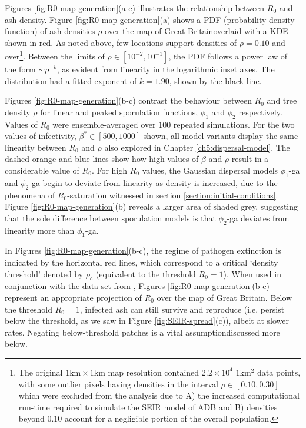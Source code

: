 
Figures \ref{fig:R0-map-generation}(a-c) illustrates the relationship between $R_0$ and ash density.
Figure \ref{fig:R0-map-generation}(a) shows a PDF (probability density function) of ash densities $\rho$ over the map of Great Britain\textemdash overlaid with a KDE shown in red.
As noted above, few locations support densities of $\rho=0.10$ and over\footnote{
The original $\mathrm{1km \times 1km}$ map resolution contained $2.2\times 10^4$ $1\mathrm{km^2}$ data points, 
with some outlier pixels having densities in the interval $\rho \in [0.10, 0.30]$ which were excluded from the analysis due to 
A) the increased computational run-time required to simulate the SEIR model of ADB  
and B) densities beyond $0.10$ account for a negligible portion of the overall population.}. 
Between the limits of $\rho \in [10^{-2}, 10^{-1}]$, the PDF follows a power law of the form $\sim \rho ^{-k}$, as evident from linearity in the logarithmic inset axes.
The distribution had a fitted exponent of $k=1.90$, shown by the black line.

Figures \ref{fig:R0-map-generation}(b-c) contrast the behaviour between $R_0$ and tree density $\rho$ for linear and peaked sporulation functions, $\phi_1$ and $\phi_2$ respectively.
Values of $R_0$ were ensemble-averaged over $100$ repeated simulations.
For the two values of infectivity, $\beta^*\in [500, 1000]$ shown, all model variants display the same linearity between $R_0$ and $\rho$ \textemdash also explored in Chapter \ref{ch5:dispersal-model}.
The dashed orange and blue lines show how high values of $\beta$ and $\rho$ result in a considerable value of $R_0$.
For high $R_0$ values, the Gaussian dispersal models $\phi_1$-ga and $\phi_2$-ga begin to deviate from linearity as density is increased,
due to the phenomena of $R_0$-saturation witnessed in section \ref{section:initial-conditions}.
Figure \ref{fig:R0-map-generation}(b) reveals a larger area of shaded grey, 
suggesting that the sole difference between sporulation models is that $\phi_2$-ga deviates from linearity more than $\phi_1$-ga.

In Figures \ref{fig:R0-map-generation}(b-c), the regime of pathogen extinction is indicated by the horizontal red lines, 
which correspond to a critical `density threshold' denoted by $\rho_c$ (equivalent to the threshold $R_0 = 1$).
When used in conjunction with the data-set from \cite{hill.data}, Figures \ref{fig:R0-map-generation}(b-c) represent an appropriate projection of $R_0$ over the map of Great Britain.
Below the threshold $R_0=1$, infected ash can still survive and reproduce (i.e. persist below the threshold, as we saw in Figure \ref{fig:SEIR-spread}(c)), albeit at slower rates.
Negating below-threshold patches is a vital assumption\textemdash discussed more below.

